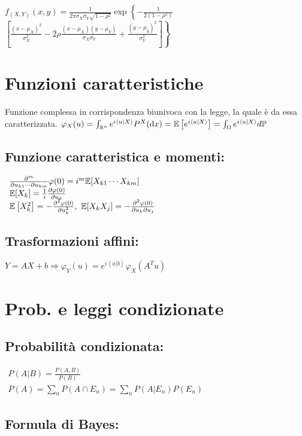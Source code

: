 $f_{(X,Y)} (x,y)=\frac{1}{2\pi \sigma_X \sigma_Y\sqrt{1-\rho^2}}\exp\left\{-\frac{1}{2( 1-\rho^2 )}\right.$\\$\left.\left[\frac{( x-\mu_X)^2}{\sigma^2_X} -2\rho \frac{( x-\mu_X)( y-\mu_Y)}{\sigma_X \sigma_Y} +\frac{( y-\mu_y)^2}{\sigma^2_Y}\right]\right\}$
\section{Funzioni caratteristiche}

Funzione complessa in corrispondenza biunivoca con la legge, la quale è da essa caratterizzata. $\varphi_X (u)=\int_{\mathbb R^n} e^{i\left< u|X\right>} P^X (\mathrm d x)=\mathbb E\left[ e^{i\left< u|X\right>}\right] =\int_{\Omega} e^{i\left< u|X\right>} d\mathbb P$
\subsection{Funzione caratteristica e momenti:}

$ \begin{array}{l}
\frac{\partial^m}{\partial u_{k1} \cdots \partial u_{km}} \varphi (0)=i^m\mathbb E[ X_{k1} \cdots X_{km}]\\
\mathbb E[ X_k] =\frac{1}{i}\frac{\partial \varphi (0)}{\partial u_k}\\
\mathbb E\left[ X^2_k\right] =-\frac{\partial^2 \varphi (0)}{\partial u^2_k} ,\ \mathbb E[ X_k X_j] =-\frac{\partial^2 \varphi (0)}{\partial u_k \partial u_j}
\end{array}$
\subsection{Trasformazioni affini:}

$Y=AX+b\Rightarrow \varphi_Y (u)=e^{i\left< u|b\right>} \varphi_X\left( A^T u\right)$
\section{Prob. e leggi condizionate}
\subsection{Probabilità condizionata:}

$ \begin{array}{l}
P(A|B)=\frac{P(A,B)}{P(B)}\\
P(A)=\sum_n P( A\cap E_n) =\sum_n P( A|E_n) P( E_n)
\end{array}$
\subsection{Formula di Bayes:}

